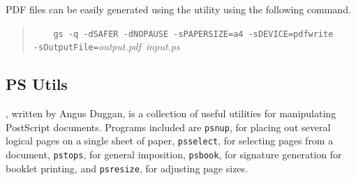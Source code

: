 \documentclass[twoside,11pt]{starlink}
\begin{document}
PDF files can be easily generated using the  utility using the following command.

\begin{quote}
\verb+    gs -q -dSAFER -dNOPAUSE -sPAPERSIZE=a4 -sDEVICE=pdfwrite+\linebreak
\verb+       -sOutputFile=+\emph{output.pdf}\verb+ +\emph{input.ps}
\end{quote}

\subsection{PS Utils\label{sc15_pstools}}

,
written by Angus Duggan, is a collection of useful utilities for
manipulating PostScript documents. Programs included are \texttt{psnup},
for placing out several logical pages on a single sheet of paper, \texttt{psselect}, for selecting pages from a document, \texttt{pstops}, for
general imposition, \texttt{psbook}, for signature generation for booklet
printing, and \texttt{psresize}, for adjusting page sizes.
\end{document}
